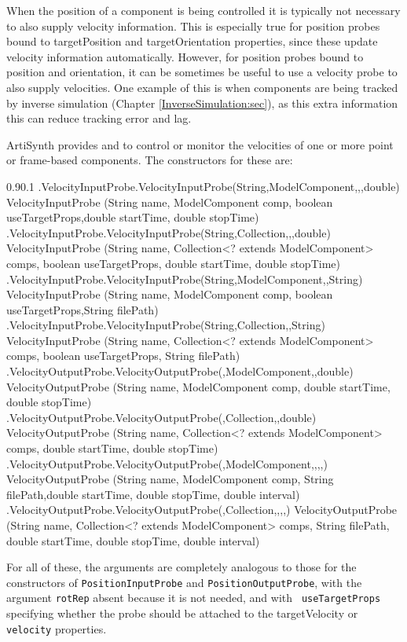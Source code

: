 When the position of a component is being controlled it is typically not
necessary to also supply velocity information. This is especially true for
position probes bound to {\sf targetPosition} and {\sf targetOrientation}
properties, since these update velocity information automatically. However, for
position probes bound to {\sf position} and {\sf orientation}, it can be
sometimes be useful to use a velocity probe to also supply velocities.  One
example of this is when components are being tracked by inverse simulation
(Chapter
\ref{InverseSimulation:sec}), as this extra information this can reduce
tracking error and lag.

ArtiSynth provides 
 and
to control or monitor the velocities of one or more point or frame-based
components. The constructors for these are:
%
\begin{methodtable}{0.9}{0.1}
\midline
%
\methodentry
{\probes.VelocityInputProbe.VelocityInputProbe(String,ModelComponent,,,double)}%
{VelocityInputProbe (String name, ModelComponent comp, 
boolean useTargetProps,\brh double startTime, double stopTime)}%
{\ }%
%
\methodspace{0.5em}%
\methodentry
{\probes.VelocityInputProbe.VelocityInputProbe(String,Collection,,,double)}%
{VelocityInputProbe (String name, Collection<? extends ModelComponent> comps,\brh
boolean useTargetProps, double startTime, double stopTime)}%
{\ }%
%
\methodspace{0.5em}%
\methodentry
{\probes.VelocityInputProbe.VelocityInputProbe(String,ModelComponent,,String)}%
{VelocityInputProbe (String name, ModelComponent comp,
boolean useTargetProps,\brh String filePath)}%
{\ }%
%
\methodspace{0.5em}%
\methodentry
{\probes.VelocityInputProbe.VelocityInputProbe(String,Collection,,String)}%
{VelocityInputProbe (String name, Collection<? extends ModelComponent> comps,\brh
boolean useTargetProps, String filePath)}%
{\ }%
\methodspace{1.05em}%
\methodentry
{\probes.VelocityOutputProbe.VelocityOutputProbe(,ModelComponent,,double)}%
{VelocityOutputProbe (String name, ModelComponent comp,\brh
double startTime, double stopTime)}%
{\ }%
%
\methodspace{0.5em}%
\methodentry
{\probes.VelocityOutputProbe.VelocityOutputProbe(,Collection,,double)}%
{VelocityOutputProbe (String name, Collection<? extends ModelComponent> comps,\brh
double startTime, double stopTime)}%
{\ }%
%
\methodspace{0.5em}%
\methodentry
{\probes.VelocityOutputProbe.VelocityOutputProbe(,ModelComponent,,,,)}%
{VelocityOutputProbe (String name, ModelComponent comp,
String filePath,\brh double startTime, double stopTime, double interval)}%
{\ }%
%
\methodspace{0.5em}%
\methodentry
{\probes.VelocityOutputProbe.VelocityOutputProbe(,Collection,,,,)}%
{VelocityOutputProbe (String name, Collection<? extends ModelComponent> comps,\brh
String filePath, double startTime, double stopTime, 
double interval)}%
{\ }%
\midline
\end{methodtable}
%
For all of these, the arguments are completely analogous to those for the
constructors of {\tt PositionInputProbe} and {\tt PositionOutputProbe}, with
the argument {\tt rotRep} absent because it is not needed, and with {\tt
useTargetProps} specifying whether the probe should be attached to the {\sf
targetVelocity} or {\tt velocity} properties.

